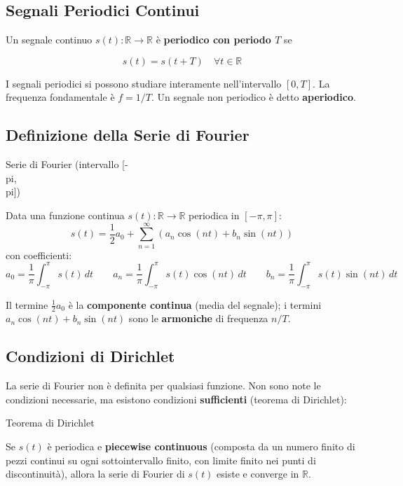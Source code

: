 \documentclass[
  italian,
  openany]{book}
\begin{document}
\subsection{Segnali Periodici
Continui}\label{segnali-periodici-continui}

Un segnale continuo \(s(t): \mathbb{R} \to \mathbb{R}\) è
\textbf{periodico con periodo \(T\)} se

\[s(t) = s(t + T) \quad \forall t \in \mathbb{R}\]

I segnali periodici si possono studiare interamente nell'intervallo
\([0, T]\). La frequenza fondamentale è \(f = 1/T\). Un segnale non
periodico è detto \textbf{aperiodico}.

\subsection{Definizione della Serie di
Fourier}\label{definizione-della-serie-di-fourier}

\begin{calloutdefinition}{Serie di Fourier (intervallo [-\\pi, \\pi])}

Data una funzione continua \(s(t): \mathbb{R} \to \mathbb{R}\) periodica
in \([-\pi, \pi]\):
\[s(t) = \frac{1}{2} a_0 + \sum_{n=1}^{\infty} \left( a_n \cos(nt) + b_n \sin(nt) \right)\]
con coefficienti:
\[a_0 = \frac{1}{\pi} \int_{-\pi}^{\pi} s(t)\, dt \qquad a_n = \frac{1}{\pi} \int_{-\pi}^{\pi} s(t) \cos(nt)\, dt \qquad b_n = \frac{1}{\pi} \int_{-\pi}^{\pi} s(t) \sin(nt)\, dt\]

\end{calloutdefinition}

Il termine \(\frac{1}{2} a_0\) è la \textbf{componente continua} (media
del segnale); i termini \(a_n \cos(nt) + b_n \sin(nt)\) sono le
\textbf{armoniche} di frequenza \(n/T\).

\subsection{Condizioni di Dirichlet}\label{condizioni-di-dirichlet}

La serie di Fourier non è definita per qualsiasi funzione. Non sono note
le condizioni necessarie, ma esistono condizioni \textbf{sufficienti}
(teorema di Dirichlet):

\begin{callouttheorem}{Teorema di Dirichlet}

Se \(s(t)\) è periodica e \textbf{piecewise continuous} (composta da un
numero finito di pezzi continui su ogni sottointervallo finito, con
limite finito nei punti di discontinuità), allora la serie di Fourier di
\(s(t)\) esiste e converge in \(\mathbb{R}\).

\end{callouttheorem}
\end{document}
